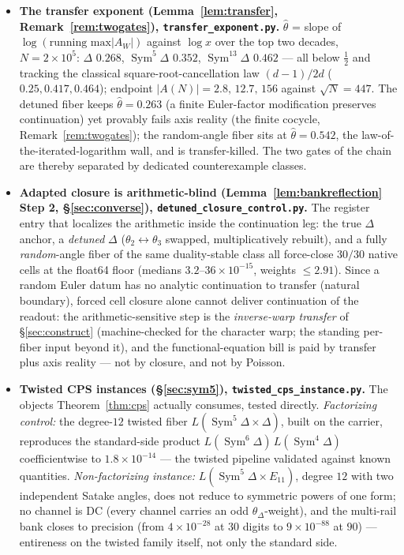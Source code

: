 \documentclass[11pt]{article}
\theoremstyle{definition}
\newcommand{\Sym}{\operatorname{Sym}}
\begin{document}
\begin{itemize}
\item \textbf{The transfer exponent (Lemma~\ref{lem:transfer}, Remark~\ref{rem:twogates}),
\texttt{transfer\_exponent.py}.} $\hat\theta$ = slope of $\log(\text{running max}|A_W|)$ against $\log x$
over the top two decades, $N=2\times10^{5}$: $\Delta$ $0.268$, $\Sym^5\Delta$ $0.352$, $\Sym^{13}\Delta$
$0.462$ --- all below $\tfrac12$ and tracking the classical square-root-cancellation law $(d-1)/2d$
($0.25,0.417,0.464$); endpoint $|A(N)|=2.8,\,12.7,\,156$ against $\sqrt N=447$. The detuned fiber keeps
$\hat\theta=0.263$ (a finite Euler-factor modification preserves continuation) yet provably fails axis
reality (the finite cocycle, Remark~\ref{rem:twogates}); the random-angle fiber sits at $\hat\theta=0.542$,
the law-of-the-iterated-logarithm wall, and is transfer-killed. The two gates of the chain are thereby
separated by dedicated counterexample classes.

\item \textbf{Adapted closure is arithmetic-blind (Lemma~\ref{lem:bankreflection} Step 2,
\S\ref{sec:converse}), \texttt{detuned\_closure\_control.py}.} The register entry that localizes the
arithmetic inside the continuation leg: the true $\Delta$ anchor, a \emph{detuned} $\Delta$
($\theta_2\leftrightarrow\theta_3$ swapped, multiplicatively rebuilt), and a fully \emph{random}-angle fiber
of the same duality-stable class all force-close $30/30$ native cells at the float64 floor (medians
$3.2$--$36\times10^{-15}$, weights $\le2.91$). Since a random Euler datum has no analytic continuation to
transfer (natural boundary), forced cell closure alone cannot deliver continuation of the readout: the
arithmetic-sensitive step is the \emph{inverse-warp transfer} of \S\ref{sec:construct} (machine-checked for
the character warp; the standing per-fiber input beyond it), and the functional-equation bill is paid by
transfer plus axis reality --- not by closure, and not by Poisson.

\item \textbf{Twisted CPS instances (\S\ref{sec:sym5}), \texttt{twisted\_cps\_instance.py}.} The objects
Theorem~\ref{thm:cps} actually consumes, tested directly. \emph{Factorizing control:} the degree-$12$ twisted
fiber $L(\Sym^5\Delta\times\Delta)$, built on the carrier, reproduces the standard-side product
$L(\Sym^6\Delta)\,L(\Sym^4\Delta)$ coefficientwise to $1.8\times10^{-14}$ --- the twisted pipeline validated
against known quantities. \emph{Non-factorizing instance:} $L(\Sym^5\Delta\times E_{11})$, degree $12$ with two
independent Satake angles, does not reduce to symmetric powers of one form; no channel is DC (every channel
carries an odd $\theta_\Delta$-weight), and the multi-rail bank closes to precision (from $4\times10^{-28}$ at
$30$ digits to $9\times10^{-88}$ at $90$) --- entireness on the twisted family itself, not only the standard side.


\end{itemize}
\end{document}
